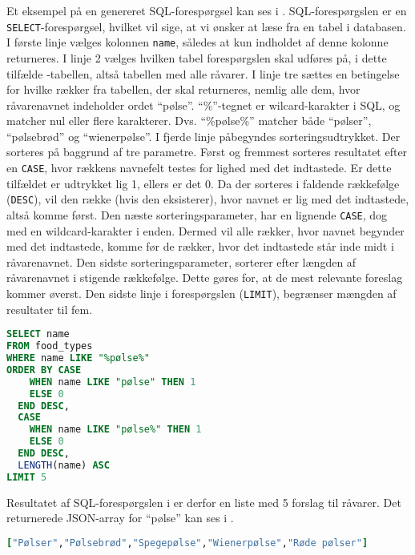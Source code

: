 Et eksempel på en genereret SQL-forespørgsel kan ses i . SQL-forespørgslen er en \texttt{SELECT}-forespørgsel, hvilket vil sige, at vi ønsker at læse fra en tabel i databasen. I første linje vælges kolonnen \texttt{name}, således at kun indholdet af denne kolonne returneres. I linje 2 vælges hvilken tabel forespørgslen skal udføres på, i dette tilfælde -tabellen, altså tabellen med alle råvarer. I linje tre sættes en betingelse for hvilke rækker fra tabellen, der skal returneres, nemlig alle dem, hvor råvarenavnet indeholder ordet ``pølse''. ``\%''-tegnet er wilcard-karakter i SQL, og matcher nul eller flere karakterer. Dvs. ``\%pølse\%'' matcher både ``pølser'', ``pølsebrød'' og ``wienerpølse''. I fjerde linje påbegyndes sorteringsudtrykket. Der sorteres på baggrund af tre parametre. Først og fremmest sorteres resultatet efter en \texttt{CASE}, hvor rækkens navnefelt testes for lighed med det indtastede. Er dette tilfældet er udtrykket lig 1, ellers er det 0. Da der sorteres i faldende rækkefølge (\texttt{DESC}), vil den række (hvis den eksisterer), hvor navnet er lig med det indtastede, altså komme først. Den næste sorteringsparameter, har en lignende \texttt{CASE}, dog med en wildcard-karakter i enden. Dermed vil alle rækker, hvor navnet begynder med det indtastede, komme før de rækker, hvor det indtastede står inde midt i råvarenavnet. Den sidste sorteringsparameter, sorterer efter længden af råvarenavnet i stigende rækkefølge. Dette gøres for, at de mest relevante foreslag kommer øverst. Den sidste linje i forespørgslen (\texttt{LIMIT}), begrænser mængden af resultater til fem.

\begin{lstlisting}[caption={Hvis en bruger indtaster ``pølse'' udføres denne SQL-forespørgsel.},label=lst:soegeforslag-sql,language=SQL]
SELECT name
FROM food_types
WHERE name LIKE "%pølse%"
ORDER BY CASE
    WHEN name LIKE "pølse" THEN 1
    ELSE 0
  END DESC,
  CASE
    WHEN name LIKE "pølse%" THEN 1
    ELSE 0
  END DESC,
  LENGTH(name) ASC
LIMIT 5
\end{lstlisting}

Resultatet af SQL-forespørgslen i  er derfor en liste med 5 forslag til råvarer. Det returnerede JSON-array for ``pølse'' kan ses i .

\begin{lstlisting}[caption={Et returneret JSON-array for ``pølse''.},label=lst:poelse-json,language=Ruby]
["Pølser","Pølsebrød","Spegepølse","Wienerpølse","Røde pølser"]
\end{lstlisting}

